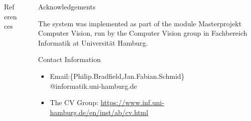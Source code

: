 \documentclass[final]{beamer}
\newlength{\sepwid}
\newlength{\onecolwid}
\newlength{\twocolwid}
\begin{document}
\begin{frame}[t]
\begin{columns}[t]
\begin{column}{\twocolwid}
\begin{columns}[t,totalwidth=\twocolwid]
\begin{column}{\onecolwid}
\begin{block}{References}
		\end{block}
		
	\end{column}	

	\begin{column}{\sepwid}\end{column} %

	\begin{column}{\onecolwid}



		\begin{block}{Acknowledgements}

		\small{The system was implemented as part of the module Masterprojekt Computer Vision, run by the Computer Vision group in Fachbereich Informatik at Universit\"{a}t Hamburg.}

		\end{block}



		\begin{block}{Contact Information}

		\begin{itemize}
			\item Email:\{Philip.Bradfield,Jan.Fabian.Schmid\}\\\hspace{3cm}@informatik.uni-hamburg.de
			\item The CV Group: \href{https://www.inf.uni-hamburg.de/en/inst/ab/cv.html}{https://www.inf.uni-hamburg.de/en/inst/ab/cv.html}
		\end{itemize}


\end{block}
\end{column}
\end{columns}
\end{column}
\end{columns}
\end{frame}
\end{document}
